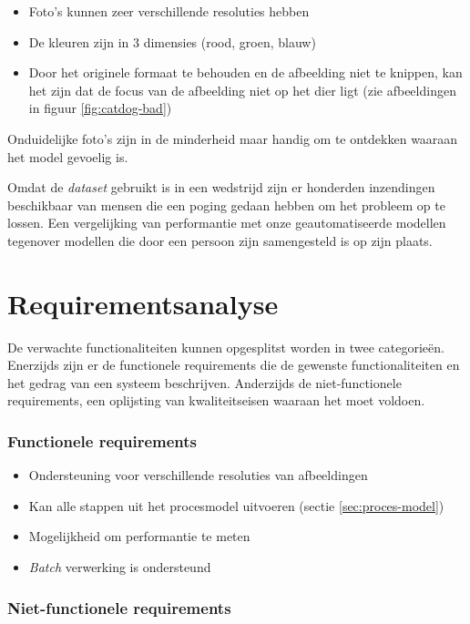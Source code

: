 \begin{itemize}
    \item Foto's kunnen zeer verschillende resoluties hebben
    \item De kleuren zijn in 3 dimensies (rood, groen, blauw)
    \item Door het originele formaat te behouden en de afbeelding niet te knippen, kan het zijn dat de focus van de afbeelding niet op het dier ligt (zie afbeeldingen in figuur \ref{fig:catdog-bad})
\end{itemize}

Onduidelijke foto's zijn in de minderheid maar handig om te ontdekken waaraan het model gevoelig is.

Omdat de \textit{dataset} gebruikt is in een wedstrijd zijn er honderden inzendingen beschikbaar van mensen die een poging gedaan hebben om het probleem op te lossen. Een vergelijking van performantie met onze geautomatiseerde modellen tegenover modellen die door een persoon zijn samengesteld is op zijn plaats.

\section{Requirementsanalyse}
\label{sec:requirements}

De verwachte functionaliteiten kunnen opgesplitst worden in twee categorieën. Enerzijds zijn er de functionele requirements die de gewenste functionaliteiten en het gedrag van een systeem beschrijven. Anderzijds de niet-functionele requirements, een oplijsting van kwaliteitseisen waaraan het moet voldoen.

\subsubsection{Functionele requirements}
\label{subsubsec:fr}

\begin{itemize}
    \item Ondersteuning voor verschillende resoluties van afbeeldingen
    \item Kan alle stappen uit het procesmodel uitvoeren (sectie \ref{sec:proces-model})
    \item Mogelijkheid om performantie te meten
    \item \textit{Batch} verwerking is ondersteund
\end{itemize}

\subsubsection{Niet-functionele requirements}
\label{subsubsec:nfr}


